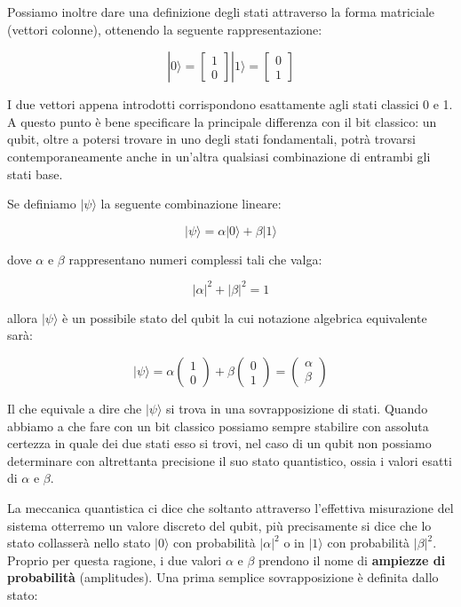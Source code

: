 Possiamo inoltre dare una definizione degli stati attraverso la forma matriciale (vettori colonne), ottenendo la seguente rappresentazione:

\[
  | 0 \rangle = \begin{bmatrix} 1 \\ 0 \end{bmatrix}
  | 1 \rangle = \begin{bmatrix} 0 \\ 1 \end{bmatrix}
\]

I due vettori appena introdotti corrispondono esattamente agli stati classici 0 e 1. A questo punto è bene specificare la principale differenza con il bit classico: un qubit, oltre a potersi trovare in uno degli stati fondamentali, potrà trovarsi contemporaneamente anche in un'altra qualsiasi combinazione di entrambi gli stati base.

Se definiamo \( | \psi \rangle \) la seguente combinazione lineare:

\[
  | \psi \rangle = \alpha | 0 \rangle + \beta | 1 \rangle
\]

dove \(\alpha\) e \(\beta\) rappresentano numeri complessi tali che valga:

\[
  \lvert \alpha \rvert ^2 + \lvert \beta \rvert ^2 = 1
\]

allora \( | \psi \rangle \) è un possibile stato del qubit la cui notazione algebrica equivalente sarà:

\[
  | \psi \rangle
  = \alpha \begin{pmatrix} 1 \\ 0 \end{pmatrix}
  + \beta \begin{pmatrix} 0 \\ 1 \end{pmatrix}
  = \begin{pmatrix} \alpha \\ \beta \end{pmatrix}
\]

Il che equivale a dire che \( | \psi \rangle \) si trova in una sovrapposizione di stati. Quando abbiamo a che fare con un bit classico possiamo sempre stabilire con assoluta certezza in quale dei due stati esso si trovi, nel caso di un qubit non possiamo determinare con altrettanta precisione il suo stato quantistico, ossia i valori esatti di \(\alpha\) e \(\beta\).

La meccanica quantistica ci dice che soltanto attraverso l'effettiva misurazione del sistema otterremo un valore discreto del qubit, più precisamente si dice che lo stato collasserà nello stato \( | 0 \rangle \) con probabilità \( \lvert \alpha \rvert ^2 \) o in \( | 1 \rangle \) con probabilità \( \lvert \beta \rvert ^2 \). Proprio per questa ragione, i due valori \(\alpha\) e \(\beta\) prendono il nome di \textbf{ampiezze di probabilità} (amplitudes). Una prima semplice sovrapposizione è definita dallo stato:

